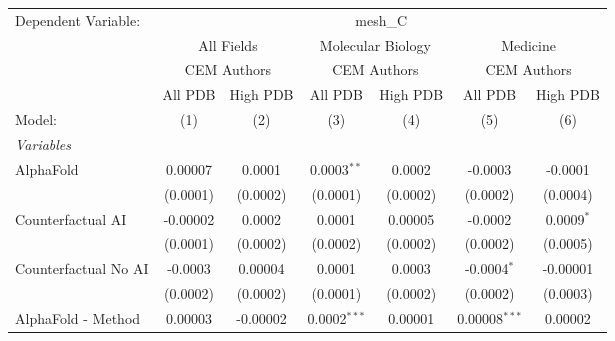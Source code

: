 \begingroup
\centering
\begin{tabular}{lcccccc}
   \tabularnewline \midrule \midrule
   Dependent Variable: & \multicolumn{6}{c}{mesh\_C}\\
 & \multicolumn{2}{c}{All Fields} & \multicolumn{2}{c}{Molecular Biology} & \multicolumn{2}{c}{Medicine} \\
\cmidrule(lr){2-3} \cmidrule(lr){4-5} \cmidrule(lr){6-7}
 & \multicolumn{2}{c}{CEM Authors} & \multicolumn{2}{c}{CEM Authors} & \multicolumn{2}{c}{CEM Authors} \\
\cmidrule(lr){2-3} \cmidrule(lr){4-5} \cmidrule(lr){6-7}
 & \multicolumn{1}{c}{All PDB} & \multicolumn{1}{c}{High PDB} & \multicolumn{1}{c}{All PDB} & \multicolumn{1}{c}{High PDB} & \multicolumn{1}{c}{All PDB} & \multicolumn{1}{c}{High PDB} \\
\cmidrule(lr){2-2} \cmidrule(lr){3-3} \cmidrule(lr){4-4} \cmidrule(lr){5-5} \cmidrule(lr){6-6} \cmidrule(lr){7-7}
   Model:                                                     & (1)            & (2)           & (3)            & (4)        & (5)             & (6)\\  
   \midrule
   \emph{Variables}\\
   AlphaFold                                                  & 0.00007        & 0.0001        & 0.0003$^{**}$  & 0.0002     & -0.0003         & -0.0001\\   
                                                              & (0.0001)       & (0.0002)      & (0.0001)       & (0.0002)   & (0.0002)        & (0.0004)\\   
   Counterfactual AI                                          & -0.00002       & 0.0002        & 0.0001         & 0.00005    & -0.0002         & 0.0009$^{*}$\\   
                                                              & (0.0001)       & (0.0002)      & (0.0002)       & (0.0002)   & (0.0002)        & (0.0005)\\   
   Counterfactual No AI                                       & -0.0003        & 0.00004       & 0.0001         & 0.0003     & -0.0004$^{*}$   & -0.00001\\   
                                                              & (0.0002)       & (0.0002)      & (0.0001)       & (0.0002)   & (0.0002)        & (0.0003)\\   
   AlphaFold - Method                                         & 0.00003        & -0.00002      & 0.0002$^{***}$ & 0.00001    & 0.00008$^{***}$ & 0.00002\\   

\end{tabular}
